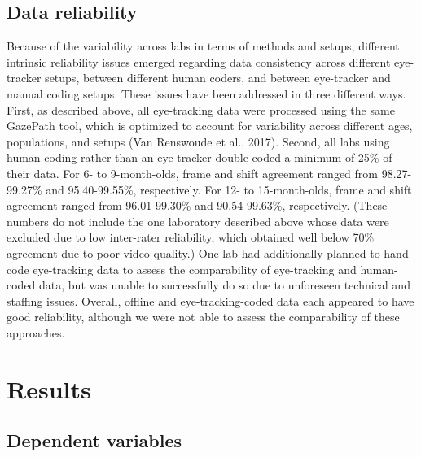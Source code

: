 \documentclass[,man,floatsintext]{apa6}
\begin{document}
\hypertarget{data-reliability}{%
\subsection{Data reliability}\label{data-reliability}}

Because of the variability across labs in terms of methods and setups, different intrinsic reliability issues emerged regarding data consistency across different eye-tracker setups, between different human coders, and between eye-tracker and manual coding setups. These issues have been addressed in three different ways. First, as described above, all eye-tracking data were processed using the same GazePath tool, which is optimized to account for variability across different ages, populations, and setups (Van Renswoude et al., 2017). Second, all labs using human coding rather than an eye-tracker double coded a minimum of 25\% of their data. For 6- to 9-month-olds, frame and shift agreement ranged from 98.27-99.27\% and 95.40-99.55\%, respectively. For 12- to 15-month-olds, frame and shift agreement ranged from 96.01-99.30\% and 90.54-99.63\%, respectively. (These numbers do not include the one laboratory described above whose data were excluded due to low inter-rater reliability, which obtained well below 70\% agreement due to poor video quality.) One lab had additionally planned to hand-code eye-tracking data to assess the comparability of eye-tracking and human-coded data, but was unable to successfully do so due to unforeseen technical and staffing issues. Overall, offline and eye-tracking-coded data each appeared to have good reliability, although we were not able to assess the comparability of these approaches.

\hypertarget{results}{%
\section{Results}\label{results}}

\hypertarget{dependent-variables}{%
\subsection{Dependent variables}\label{dependent-variables}}
\end{document}

